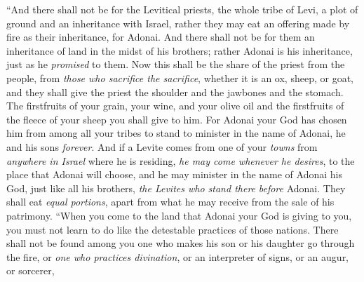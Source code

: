 \begin{biblechapter} %
\verse “And there shall not be for the Levitical priests, the whole tribe of Levi, a plot of ground and an inheritance with Israel, rather they may eat an offering made by fire as their inheritance, for Adonai.
\verse And there shall not be for them an inheritance of land in the midst of his brothers; rather Adonai is his inheritance, just as he \textit{promised} to them.
\verse Now this shall be the share of the priest from the people, from \textit{those who sacrifice the sacrifice}, whether it is an ox, sheep, or goat, and they shall give the priest the shoulder and the jawbones and the stomach.
\verse The firstfruits of your grain, your wine, and your olive oil and the firstfruits of the fleece of your sheep you shall give to him.
\verse For Adonai your God has chosen him from among all your tribes to stand to minister in the name of Adonai, he and his sons \textit{forever}.
\verse And if a Levite comes from one of your \textit{towns} from \textit{anywhere in Israel} where he is residing, \textit{he may come whenever he desires}, to the place that Adonai will choose,
\verse and he may minister in the name of Adonai his God, just like all his brothers, \textit{the Levites who stand there} \textit{before} Adonai.
\verse They shall eat \textit{equal portions}, apart from what he may receive from the sale of his patrimony.
\verse “When you come to the land that Adonai your God is giving to you, you must not learn to do like the detestable practices of those nations.
\verse There shall not be found among you one who makes his son or his daughter go through the fire, or \textit{one who practices divination}, or an interpreter of signs, or an augur, or sorcerer,

\end{biblechapter}
